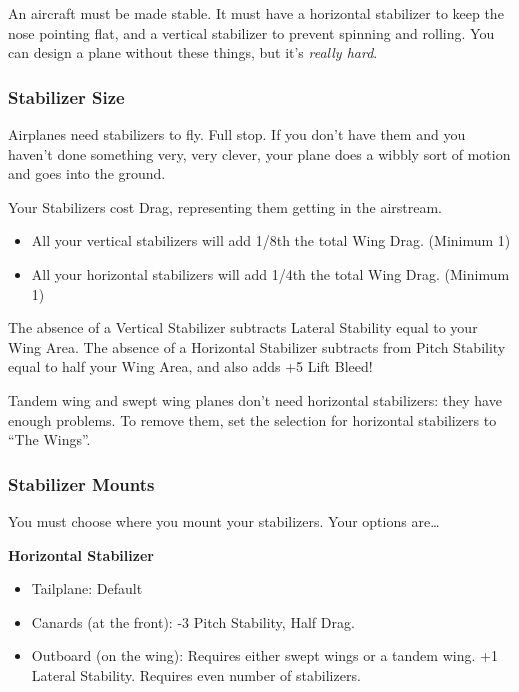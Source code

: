 \documentclass{article}
\begin{document}
An aircraft must be made stable. It must have a horizontal stabilizer to
keep the nose pointing flat, and a vertical stabilizer to prevent
spinning and rolling. You can design a plane without these things, but
it's \emph{really hard}.

\subsubsection{Stabilizer Size}
\label{_Stabilizer Size}

Airplanes need stabilizers to fly. Full stop. If you don't have them and
you haven't done something very, very clever, your plane does a wibbly
sort of motion and goes into the ground.

Your Stabilizers cost Drag, representing them getting in the airstream.

\begin{itemize}
  \item          All your vertical stabilizers will add 1/8th the total Wing
        Drag. (Minimum 1)
  \item          All your horizontal stabilizers will add 1/4th the total Wing
        Drag. (Minimum 1)
\end{itemize}

The absence of a Vertical Stabilizer subtracts Lateral Stability equal
to your Wing Area. The absence of a Horizontal Stabilizer subtracts from
Pitch Stability equal to half your Wing Area, and also adds +5 Lift
Bleed!

Tandem wing and swept wing planes don't need horizontal stabilizers:
they have enough problems. To remove them, set the selection for
horizontal stabilizers to ``The Wings''.

\subsubsection{Stabilizer Mounts}
\label{_Stabilizer Mounts}

You must choose where you mount your stabilizers. Your options
are\ldots{}

\textbf{Horizontal Stabilizer}

\begin{itemize}
  \item          Tailplane: Default
  \item          Canards (at the front): -3 Pitch Stability, Half Drag.
  \item          Outboard (on the wing): Requires either swept wings or a tandem
        wing. +1 Lateral Stability. Requires even number of stabilizers.
\end{itemize}
\end{document}
